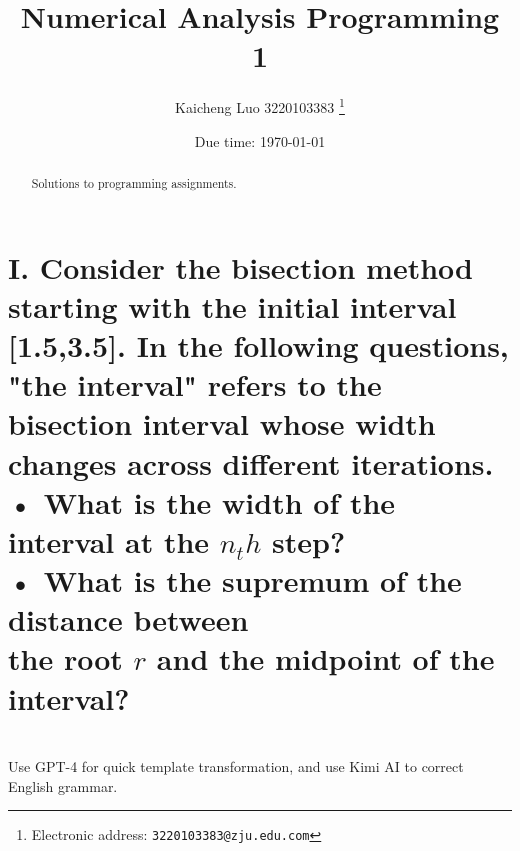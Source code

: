 \documentclass[a4paper]{article}
\begin{document}
\title{Numerical Analysis Programming 1}

\author{Kaicheng Luo 3220103383
  \thanks{Electronic address: \texttt{3220103383@zju.edu.com}}}

\date{Due time: \today}

\maketitle

\begin{abstract}
    Solutions to programming assignments.
\end{abstract}

\section*{I. Consider the bisection method starting with the initial interval [1.5,3.5]. In the following questions, "the interval" refers to the bisection interval whose width changes across different iterations.\\
 • What is the width of the interval at the \(n_th\) step?\\
 • What is the supremum of the distance between\\
 the root \( r \) and the midpoint of the interval?}


 

\section*{  }
Use GPT-4 for quick template transformation, and use Kimi AI to correct English grammar.
\end{document}
